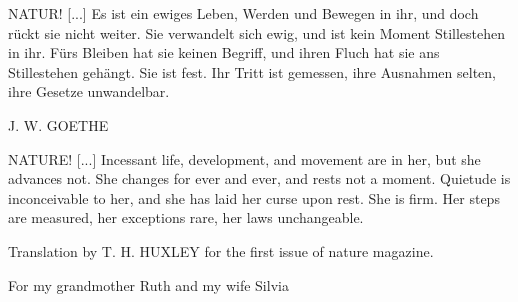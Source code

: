 
\begin{dedication} %

  NATUR! [...] Es ist ein ewiges Leben, Werden und Bewegen in ihr, und
  doch r\"uckt sie nicht weiter. Sie verwandelt sich ewig, und ist kein
  Moment Stillestehen in ihr. F\"urs Bleiben hat sie keinen Begriff, und
  ihren Fluch hat sie ans Stillestehen geh\"angt. Sie ist fest. Ihr
  Tritt ist gemessen, ihre Ausnahmen selten, ihre Gesetze unwandelbar.\\
  \begin{flushleft}
    J. W. GOETHE
  \end{flushleft}
  
  \vspace{1cm}

  NATURE! [...] Incessant life, development, and movement are in her,
  but she advances not. She changes for ever and ever, and rests not a
  moment. Quietude is inconceivable to her, and she has laid her curse
  upon rest. She is firm. Her steps are measured, her exceptions rare,
  her laws unchangeable.\\
  \begin{flushleft} 
    Translation by T. H. HUXLEY for the first issue of nature magazine.
 \end{flushleft}

  \vspace{3cm}

  For my grandmother Ruth and my wife Silvia

\end{dedication}

